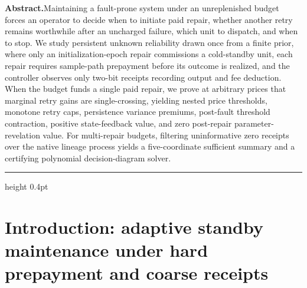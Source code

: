 \documentclass[11pt,letterpaper]{article}
\begin{document}
\linenumbers
\noindent\textbf{Abstract.}\quad Maintaining a fault-prone system under
an unreplenished budget forces an operator to decide when to initiate
paid repair, whether another retry remains worthwhile after an uncharged
failure, which unit to dispatch, and when to stop. We study persistent
unknown reliability drawn once from a finite prior, where only an
initialization-epoch repair commissions a cold-standby unit, each repair
requires sample-path prepayment before its outcome is realized, and the
controller observes only two-bit receipts recording output and fee
deduction. When the budget funds a single paid repair, we prove at
arbitrary prices that marginal retry gains are single-crossing, yielding
nested price thresholds, monotone retry caps, persistence variance
premiums, post-fault threshold contraction, positive state-feedback
value, and zero post-repair parameter-revelation value. For multi-repair
budgets, filtering uninformative zero receipts over the native lineage
process yields a five-coordinate sufficient summary and a certifying
polynomial decision-diagram solver.\par
\vspace{10pt}
\hrule height 0.4pt
\vspace{12pt}

\section{Introduction: adaptive standby maintenance under hard
prepayment and coarse
receipts}\label{introduction-adaptive-standby-maintenance-under-hard-prepayment-and-coarse-receipts}
\end{document}
